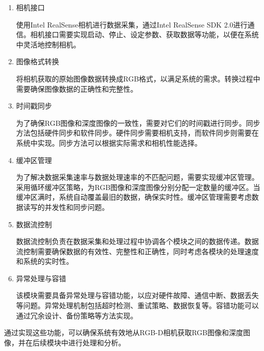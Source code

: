 \begin{enumerate}
	\item{相机接口}
	\par 使用Intel RealSense相机进行数据采集，通过Intel RealSense SDK 2.0进行通信。相机接口需要实现启动、停止、设定参数、获取数据等功能，以便在系统中灵活地控制相机。

	\item{图像格式转换}
	\par 将相机获取的原始图像数据转换成RGB格式，以满足系统的需求。转换过程中需要确保图像数据的正确性和完整性。

	\item{时间戳同步}
	\par 为了确保RGB图像和深度图像的一致性，需要对它们的时间戳进行同步。同步方法包括硬件同步和软件同步。硬件同步需要相机支持，而软件同步则需要在系统中实现。同步方法可以根据实际需求和相机性能选择。

	\item{缓冲区管理}
	\par 为了解决数据采集速率与数据处理速率的不匹配问题，需要实现缓冲区管理。采用循环缓冲区策略，为RGB图像和深度图像分别分配一定数量的缓冲区。当缓冲区满时，系统自动覆盖最旧的数据，确保实时性。缓冲区管理需要考虑数据读写的并发性和同步问题。

	\item{数据流控制}
	\par 数据流控制负责在数据采集和处理过程中协调各个模块之间的数据传递。数据流控制需要确保数据的有效性、完整性和正确性，同时考虑各模块的处理速度和系统的实时性。

	\item{异常处理与容错}
	\par 该模块需要具备异常处理与容错功能，以应对硬件故障、通信中断、数据丢失等问题。异常处理机制包括超时检测、重试策略、数据恢复等。容错功能可以通过冗余设计、备份策略等方法实现。
\end{enumerate}

\par 通过实现这些功能，可以确保系统有效地从RGB-D相机获取RGB图像和深度图像，并在后续模块中进行处理和分析。

